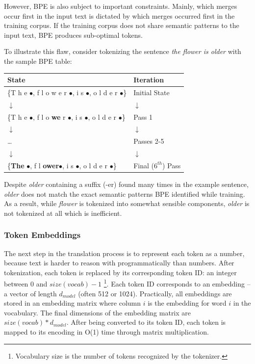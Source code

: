 However, BPE is also subject to important constraints. Mainly, which merges occur first in the input text is dictated by which merges occurred first in the training corpus. If the training corpus does not share semantic patterns to the input text, BPE produces sub-optimal tokens.

To illustrate this flaw, consider tokenizing the sentence \textit{the flower is older} with the sample BPE table:

\begin{table}[h]
    \centering
    \begin{tabular}{l|l}
        \textbf{State} & \textbf{Iteration} \\
        \hline
        \{T h e $\bullet$, f l o w e r $\bullet$, i s $\bullet$, o l d e r $\bullet$\} & Initial State \\
        \hspace*{3cm} $\downarrow$ & \hspace*{0.5cm} $\downarrow$ \\
        \{T h e $\bullet$, f l o \textbf{we} r $\bullet$, i s $\bullet$, o l d e r $\bullet$\}  & Pass 1 \\
        \hspace*{3cm} $\downarrow$ & \hspace*{0.5cm} $\downarrow$ \\
        \hspace*{3cm} \dots & Passes 2-5 \\
        \hspace*{3cm} $\downarrow$ & \hspace*{0.5cm} $\downarrow$ \\
        \{\textbf{The} $\bullet$, f l \textbf{ower$\bullet$}, i s $\bullet$, o l d e r $\bullet$\} & Final ($6^{th}$) Pass \\
    \end{tabular}
\end{table}

Despite \textit{older} containing a suffix (-er) found many times in the example sentence, \textit{older} does not match the exact semantic patterns BPE identified while training. As a result, while \textit{flower} is tokenized into somewhat sensible components, \textit{older} is not tokenized at all which is inefficient.

\subsubsection{Token Embeddings}
The next step in the translation process is to represent each token as a number, because text is harder to reason with programmatically than numbers. After tokenization, each token is replaced by its corresponding token ID: an integer between 0 and $size(vocab) - 1$ \footnote{Vocabulary size is the number of tokens recognized by the tokenizer.}. Each token ID corresponds to an embedding – a vector of length $d_{model}$ (often 512 or 1024). Practically, all embeddings are stored in an embedding matrix where column $i$ is the embedding for word $i$ in the vocabulary. The final dimensions of the embedding matrix are $size(vocab)*d_{model}$. After being converted to its token ID, each token is mapped to its encoding in O(1) time through matrix multiplication.

